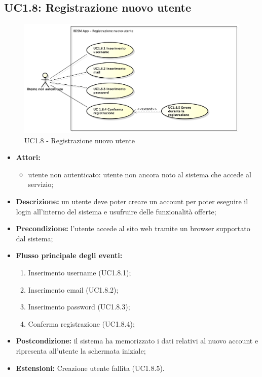 \pagebreak


\subsection{UC1.8: Registrazione nuovo utente}
\begin{figure}[!htbp]
	\centering
	\centerline{\includegraphics[scale=0.45]{./images/UC1_8.pdf}}
	\caption{UC1.8 - Registrazione nuovo utente}
\end{figure}

\begin{itemize}
	\item \textbf{Attori:}
	\begin{itemize}
		\item utente non autenticato: utente non ancora noto al sistema che accede al servizio;
	\end{itemize}
	\item \textbf{Descrizione:} un utente deve poter creare un account per poter eseguire il login
	all'interno del sistema e usufruire delle funzionalità offerte;
	\item \textbf{Precondizione:} l'utente accede al sito web tramite un browser supportato
	dal sistema;
	\item \textbf{Flusso principale degli eventi:}
	\begin{enumerate}
		\item Inserimento username (UC1.8.1);
		\item Inserimento email (UC1.8.2);
		\item Inserimento password (UC1.8.3);
		\item Conferma registrazione (UC1.8.4);
	\end{enumerate}
	\item \textbf{Postcondizione:} il sistema ha memorizzato i dati relativi al nuovo account e
	ripresenta all'utente la schermata iniziale;
	\item \textbf{Estensioni:} Creazione utente fallita (UC1.8.5).
\end{itemize}

